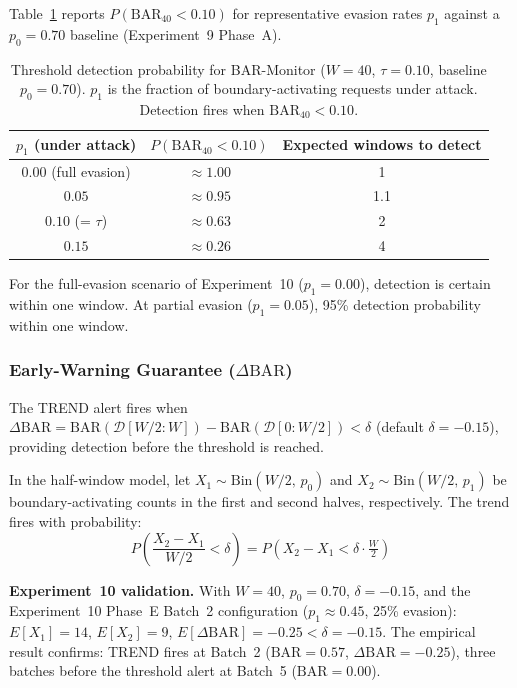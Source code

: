 \documentclass[11pt]{article}
\theoremstyle{definition}
\begin{document}
Table~\ref{tab:detection-prob} reports $P(\mathrm{BAR}_{40} < 0.10)$ for
representative evasion rates $p_1$ against a $p_0 = 0.70$ baseline
(Experiment~9 Phase~A).

\begin{table}[h!]
\centering\small
\caption{Threshold detection probability for BAR-Monitor ($W=40$, $\tau=0.10$,
baseline $p_0=0.70$). $p_1$ is the fraction of boundary-activating requests
under attack. Detection fires when $\mathrm{BAR}_{40} < 0.10$.}
\label{tab:detection-prob}
\begin{tabular}{@{}ccc@{}}
\toprule
$p_1$ (under attack) & $P(\mathrm{BAR}_{40} < 0.10)$ & Expected windows to detect \\
\midrule
$0.00$ (full evasion) & $\approx 1.00$ & 1 \\
$0.05$               & $\approx 0.95$ & 1.1 \\
$0.10$ (= $\tau$)    & $\approx 0.63$ & 2 \\
$0.15$               & $\approx 0.26$ & 4 \\
\bottomrule
\end{tabular}
\end{table}

For the full-evasion scenario of Experiment~10 ($p_1 = 0.00$), detection is
certain within one window.
At partial evasion ($p_1 = 0.05$), 95\% detection probability within one window.

\subsubsection*{Early-Warning Guarantee ($\Delta\mathrm{BAR}$)}

The TREND alert fires when $\Delta\mathrm{BAR} = \mathrm{BAR}(\mathcal{D}[W/2{:}W]) - \mathrm{BAR}(\mathcal{D}[0{:}W/2]) < \delta$
(default $\delta = -0.15$), providing detection before the threshold is reached.

In the half-window model, let $X_1 \sim \mathrm{Bin}(W/2,\, p_0)$ and
$X_2 \sim \mathrm{Bin}(W/2,\, p_1)$ be boundary-activating counts in the
first and second halves, respectively.
The trend fires with probability:
\[
  P\!\left(\frac{X_2 - X_1}{W/2} < \delta\right)
  = P\!\left(X_2 - X_1 < \delta \cdot \tfrac{W}{2}\right)
\]

\textbf{Experiment~10 validation.}
With $W=40$, $p_0=0.70$, $\delta=-0.15$, and the Experiment~10 Phase~E
Batch~2 configuration ($p_1 \approx 0.45$, 25\% evasion):
$E[X_1] = 14$, $E[X_2] = 9$, $E[\Delta\mathrm{BAR}] = -0.25 < \delta = -0.15$.
The empirical result confirms: TREND fires at Batch~2
($\mathrm{BAR}=0.57$, $\Delta\mathrm{BAR}=-0.25$),
three batches before the threshold alert at Batch~5 ($\mathrm{BAR}=0.00$).
\end{document}
